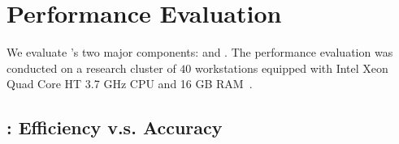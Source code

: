 
\section{Performance Evaluation}
\label{sec-perf}

We evaluate \app's two major components:
\sia and \pia.
The performance evaluation was conducted on a research
cluster of $40$ workstations
equipped with Intel Xeon Quad Core HT 3.7 GHz CPU
and 16 GB RAM~\cite{zoo}.

\subsection{\sia: Efficiency v.s. Accuracy}
\label{subsec-performance}

